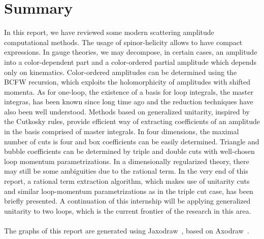 \section{Summary}
In this report, we have reviewed some modern scattering amplitude computational methods. 
The usage of spinor-helicity allows to have compact expressions.
In gauge theories, we may decompose, in certain cases, an amplitude into a color-dependent part and a color-ordered partial amplitude which depends only on kinematics.
Color-ordered amplitudes can be determined using the BCFW recursion, which exploits the holomorphicity of amplitudes with shifted momenta. 
As for one-loop, the existence of a basis for loop integrals, the master integras, has been known since long time ago and the reduction techniques have also been well understood. 
Methods based on generalized unitarity, inspired by the Cutkosky rules, provide efficient way of extracting coefficients of an amplitude in the basis comprised of master integrals. 
In four dimensions, the maximal number of cuts is four and box coefficients can be easily determined. 
Triangle and bubble coefficients can be determined by triple and double cuts with well-chosen loop momentum parametrizations.
In a dimensionally regularized theory, there may still be some ambiguities due to the rational term. 
In the very end of this report, a rational term extraction algorithm, which makes use of unitarity cuts and similar loop-momentum parametrizations as in the triple cut case, has been briefly presented. 
A continuation of this internship will be applying generalized unitarity to two loops, which is the current frontier of the research in this area.   
\\\\
The graphs of this report are generated using Jaxodraw~\cite{Binosi:2003yf}, based on Axodraw~\cite{1994CoPhC..83...45V}.

